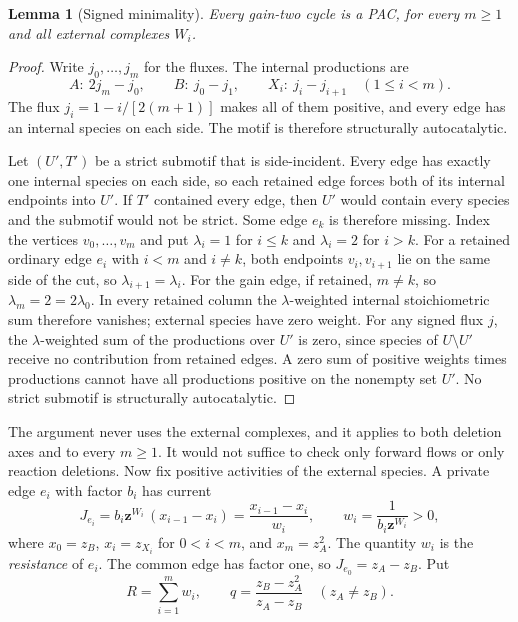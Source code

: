 \documentclass[11pt,a4paper]{article}
\theoremstyle{plain}
\newtheorem{lemma}[theorem]{Lemma}
\theoremstyle{definition}
\theoremstyle{remark}
\newcommand{\act}{\boldsymbol z}
\begin{document}
\begin{lemma}[Signed minimality]\label{lem:pac}
Every gain-two cycle is a PAC, for every $m\ge1$ and all external complexes $W_i$.
\end{lemma}

\begin{proof}
Write $j_0,\ldots,j_m$ for the fluxes. The internal productions are
\begin{equation}\label{eq:cycleprod}
 A:\ 2j_m-j_0,\qquad B:\ j_0-j_1,\qquad X_i:\ j_i-j_{i+1}\quad(1\le i<m).
\end{equation}
The flux $j_i=1-i/[2(m+1)]$ makes all of them positive, and every edge has an internal species on each side. The motif is therefore structurally autocatalytic.

Let $(U',T')$ be a strict submotif that is side-incident. Every edge has exactly one internal species on each side, so each retained edge forces both of its internal endpoints into $U'$. If $T'$ contained every edge, then $U'$ would contain every species and the submotif would not be strict. Some edge $e_k$ is therefore missing. Index the vertices $v_0,\ldots,v_m$ and put $\lambda_i=1$ for $i\le k$ and $\lambda_i=2$ for $i>k$. For a retained ordinary edge $e_i$ with $i<m$ and $i\ne k$, both endpoints $v_i,v_{i+1}$ lie on the same side of the cut, so $\lambda_{i+1}=\lambda_i$. For the gain edge, if retained, $m\ne k$, so $\lambda_m=2=2\lambda_0$. In every retained column the $\lambda$-weighted internal stoichiometric sum therefore vanishes; external species have zero weight. For any signed flux $j$, the $\lambda$-weighted sum of the productions over $U'$ is zero, since species of $U\setminus U'$ receive no contribution from retained edges. A zero sum of positive weights times productions cannot have all productions positive on the nonempty set $U'$. No strict submotif is structurally autocatalytic.
\end{proof}

The argument never uses the external complexes, and it applies to both deletion axes and to every $m\ge1$. It would not suffice to check only forward flows or only reaction deletions. Now fix positive activities of the external species. A private edge $e_i$ with factor $b_i$ has current
\[
 J_{e_i}=b_i\act^{W_i}\,(x_{i-1}-x_i)=\frac{x_{i-1}-x_i}{w_i},\qquad w_i=\frac1{b_i\act^{W_i}}>0,
\]
where $x_0=z_B$, $x_i=z_{X_i}$ for $0<i<m$, and $x_m=z_A^2$. The quantity $w_i$ is the \emph{resistance} of $e_i$. The common edge has factor one, so $J_{e_0}=z_A-z_B$. Put
\begin{equation}\label{eq:Rq}
 R=\sum_{i=1}^mw_i,\qquad q=\frac{z_B-z_A^2}{z_A-z_B}\quad(z_A\ne z_B).
\end{equation}
\end{document}
